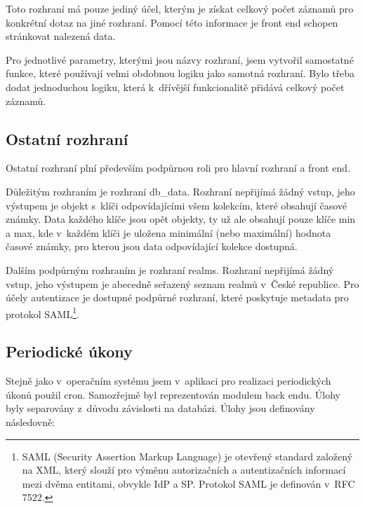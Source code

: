 \documentclass[thesis=M,czech]{FITthesis}[2012/06/26]
\begin{document}
       Toto rozhraní má pouze jediný účel, kterým je získat celkový
       počet záznamů pro konkrétní dotaz na jiné rozhraní.
       Pomocí této informace je front end schopen stránkovat
       nalezená data.

       Pro jednotlivé parametry, kterými jsou názvy rozhraní, 
       jsem vytvořil samostatné funkce,
       které používají velmi obdobnou logiku jako samotná rozhraní.
       Bylo třeba dodat jednoduchou logiku, 
       která k~dřívější funkcionalitě přidává celkový počet záznamů.

    \subsection{Ostatní rozhraní}
      
      Ostatní rozhraní plní především podpůrnou roli pro hlavní rozhraní a front end.

      Důležitým rozhraním je rozhraní db\_data. 
      Rozhraní nepřijímá žádný vstup, jeho výstupem je objekt
      s~klíči odpovídajícími všem kolekcím, 
      které obsahují časové známky.
      Data každého klíče jsou opět objekty, ty už ale obsahují pouze klíče min a max, 
      kde v~každém klíči je uložena minimální (nebo maximální) hodnota
      časové známky, pro kterou jsou data odpovídající kolekce dostupná.
      
      Dalším podpůrným rozhraním je rozhraní realms.
      Rozhraní nepřijímá žádný vstup, jeho výstupem
      je abecedně seřazený seznam realmů v~České republice.
      Pro účely autentizace je dostupné podpůrné rozhraní, které
      poskytuje metadata pro protokol SAML\footnote{
        SAML (Security Assertion Markup Language) je otevřený standard založený na XML, 
        který slouží pro výměnu autorizačních a autentizačních informací mezi dvěma entitami, obvykle IdP a SP.
        Protokol SAML je definován v~RFC 7522.
      }.

    \subsection{Periodické úkony}

      Stejně jako v~operačním systému jsem v~aplikaci pro realizaci periodických úkonů použil cron.
      Samozřejmě byl reprezentován modulem back endu.
      Úlohy byly separovány z~důvodu závislosti na databázi.
      Úlohy jsou definovány následovně:
\end{document}
